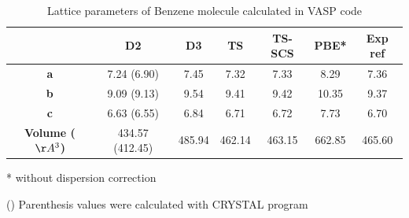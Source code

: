  	\begin{table}[H]
 		\caption{Lattice parameters of Benzene molecule calculated in VASP code} \label{table-benzsol}
 		\begin{center}
 			\begin{threeparttable}
 			\begin{tabular}{c c c c c c c}
 				\toprule
 				& \textbf{D2} & \textbf{D3} & \textbf{TS} & \textbf{TS-SCS} & \textbf{PBE*} & \textbf{Exp} ref\cite{meijer1996density} \\
 				\midrule
 				\textbf{a} &7.24 (6.90)& 7.45 & 7.32 & 7.33  & 8.29 & 7.36\\
 				\textbf{b}& 9.09 (9.13) & 9.54 & 9.41 & 9.42 & 10.35 & 9.37\\
 				\textbf{c}& 6.63 (6.55) & 6.84 & 6.71 & 6.72 & 7.73 & 6.70 \\
 				\textbf{Volume ($\AA^{3}$)}& 434.57 (412.45) & 485.94& 462.14 & 463.15 & 662.85 & 465.60\\
 				\bottomrule
 			\end{tabular}
 			
 			\begin{tablenotes}
 				\item[*] without dispersion correction
 				\item[()] Parenthesis values were calculated with CRYSTAL program
 			\end{tablenotes}
 		\end{threeparttable}
 		\end{center}
 	\end{table}
 
